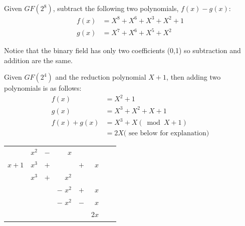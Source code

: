 \begin{exer} Given $GF(2^8)$, subtract the following two polynomials, $f(x) - g(x)$:
\begin{align*}	
	f(x) &= X^8 +         X^6 +          X^3 + X^2 + 1\\
	g(x) &=        X^7 + X^6 + X^5 +          X^2
\end{align*}
\end{exer}
\begin{rem}
Notice that the binary field has only two coefficients (0,1) so subtraction and addition are the same.
\end{rem}
\begin{eg}Given $GF(2^4)$ and the reduction polynomial $X + 1$, then adding two polynomials is as follows:
\begin{align*}	
	f(x) &=  X^2 + 1\\
	g(x) &= X^3 + X^2 + X + 1\\
	f(x) + g(x) &= X^3 + X (\bmod X + 1)\\
	&= 2X \text{( see below for explanation)}
\end{align*}
\begin{center}
\begin{tabular}{rrcrcrcr}
        &  $x^2$  &  $-$       &$x$&            \\ \cline{2-8}
 \multicolumn{1}{r|}{$x + 1$}
        &  $x^3$  &  $+$  &    &  $+$  & $ x$  \\
        & $x^3$   &  $+$  &    $x^2$ \\ \cline{2-8}
        &         &       &    $-$     $x^2$  &   $+$ &  $x$\\
        &         &       &    $-$     $x^2$  &  $-$  &   $x$  \\ \cline{4-8}
        &         &       &                    &          &   $2x$    &&
\end{tabular}
\end{center}
\end{eg}

